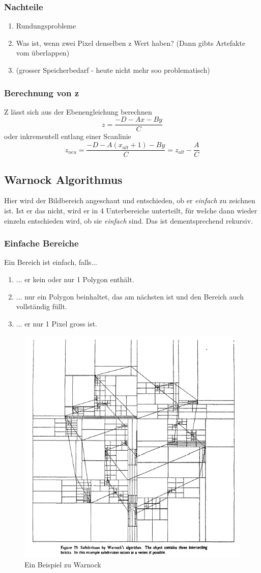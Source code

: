 \subsubsection{Nachteile}
\begin{enumerate}
	\item Rundungsprobleme
	\item Was ist, wenn zwei Pixel denselben z Wert haben? (Dann gibts Artefakte vom überlappen)
	\item (grosser Speicherbedarf - heute nicht mehr soo problematisch)
\end{enumerate}
\subsubsection{Berechnung von z}
Z lässt sich aus der Ebenengleichung berechnen
\begin{displaymath}
	z = \frac{-D-Ax-By}{C}
\end{displaymath}
oder inkrementell entlang einer Scanlinie
\begin{displaymath}
	z_{neu} = \frac{-D-A(x_{alt}+1)-By}{C}=z_{alt}-\frac{A}{C}
\end{displaymath}
\subsection{Warnock Algorithmus}
Hier wird der Bildbereich angeschaut und entschieden, ob er \textit{einfach} zu zeichnen ist. Ist er das nicht, wird er in 4 Unterbereiche unterteilt, für welche dann wieder einzeln entschieden wird, ob sie \textit{einfach} sind. Das ist dementsprechend rekursiv.
\subsubsection{Einfache Bereiche}
Ein Bereich ist einfach, falls...
\begin{enumerate}
	\item ... er kein oder nur 1 Polygon enthält.
	\item ... nur ein Polygon beinhaltet, das am nächsten ist und den Bereich auch vollständig füllt.
	\item ... er nur 1 Pixel gross ist.
\end{enumerate}
\begin{figure}[!ht]
	\centering
	\includegraphics[width=0.5\linewidth]{fig/warnock}
	\caption{Ein Beispiel zu Warnock}
	\label{fig:warnock}
\end{figure}
